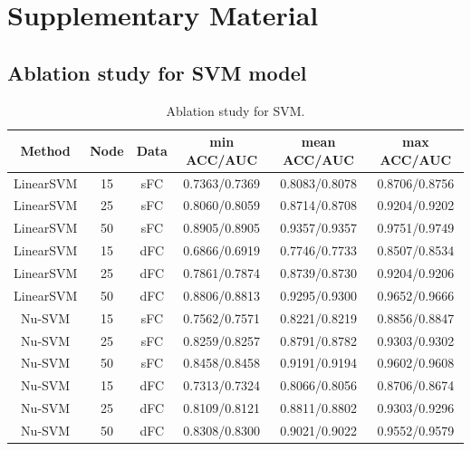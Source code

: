 \documentclass[11pt]{article}
\renewcommand\thesection{\arabic{section}}
\begin{document}



\newpage

\appendix
\renewcommand\thesection{\Alph{section}}

\section{Supplementary Material}

\subsection{Ablation study for SVM model}

\begin{table}[H]
    \centering
    \begin{tabular}{|c|c|c|c|c|c|}
        \hline
        Method    & Node & Data & min ACC/AUC   & mean ACC/AUC  & max ACC/AUC   \\
        \hline
        LinearSVM & 15   & sFC  & 0.7363/0.7369 & 0.8083/0.8078 & 0.8706/0.8756 \\
        \hline
        LinearSVM & 25   & sFC  & 0.8060/0.8059 & 0.8714/0.8708 & 0.9204/0.9202 \\
        \hline
        LinearSVM & 50   & sFC  & 0.8905/0.8905 & 0.9357/0.9357 & 0.9751/0.9749 \\
        \hline
        LinearSVM & 15   & dFC  & 0.6866/0.6919 & 0.7746/0.7733 & 0.8507/0.8534 \\
        \hline
        LinearSVM & 25   & dFC  & 0.7861/0.7874 & 0.8739/0.8730 & 0.9204/0.9206 \\
        \hline
        LinearSVM & 50   & dFC  & 0.8806/0.8813 & 0.9295/0.9300 & 0.9652/0.9666 \\
        \hline
        Nu-SVM    & 15   & sFC  & 0.7562/0.7571 & 0.8221/0.8219 & 0.8856/0.8847 \\
        \hline
        Nu-SVM    & 25   & sFC  & 0.8259/0.8257 & 0.8791/0.8782 & 0.9303/0.9302 \\
        \hline
        Nu-SVM    & 50   & sFC  & 0.8458/0.8458 & 0.9191/0.9194 & 0.9602/0.9608 \\
        \hline
        Nu-SVM    & 15   & dFC  & 0.7313/0.7324 & 0.8066/0.8056 & 0.8706/0.8674 \\
        \hline
        Nu-SVM    & 25   & dFC  & 0.8109/0.8121 & 0.8811/0.8802 & 0.9303/0.9296 \\
        \hline
        Nu-SVM    & 50   & dFC  & 0.8308/0.8300 & 0.9021/0.9022 & 0.9552/0.9579 \\
        \hline
    \end{tabular}
    \caption{Ablation study for SVM.}
\end{table}
\end{document}
